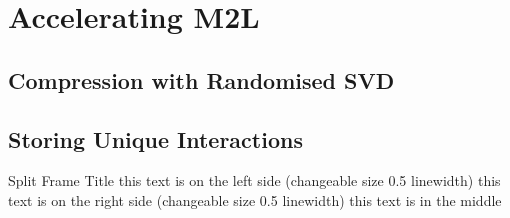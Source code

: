 \section{Accelerating M2L}

\subsection{Compression with Randomised SVD}
\subsection{Storing Unique Interactions}

\begin{splitframe}{0.5}{0.5}{Split Frame Title}
{this text is on the left side (changeable size 0.5 linewidth)}
{this text is on the right side (changeable size 0.5 linewidth)}
this text is in the middle
\end{splitframe}
